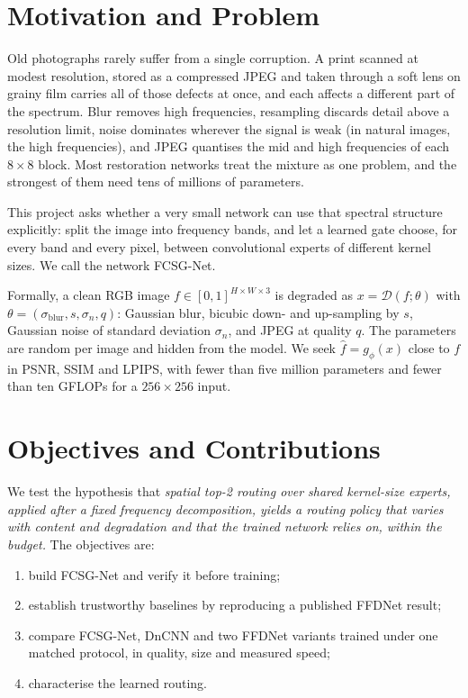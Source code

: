 \documentclass[12pt,a4paper,oneside]{NITR}
\newcommand{\fcsg}{FCSG-Net}
\begin{document}
\section{Motivation and Problem}\label{sec:motivation}

Old photographs rarely suffer from a single corruption. A print scanned at
modest resolution, stored as a compressed JPEG and taken through a soft lens
on grainy film carries all of those defects at once, and each affects a
different part of the spectrum. Blur removes high frequencies, resampling
discards detail above a resolution limit, noise dominates wherever the signal
is weak (in natural images, the high frequencies), and JPEG quantises the mid
and high frequencies of each $8\times8$ block. Most restoration networks
treat the mixture as one problem, and the strongest of them
need tens of millions of parameters.

This project asks whether a very small network can use that spectral
structure explicitly: split the image into frequency bands, and let a learned
gate choose, for every band and every pixel, between convolutional experts of
different kernel sizes. We call the network \fcsg{}.

Formally, a clean RGB image $f\in[0,1]^{H\times W\times 3}$ is degraded as
$x=\mathcal{D}(f;\theta)$ with $\theta=(\sigma_\text{blur}, s, \sigma_n, q)$:
Gaussian blur, bicubic down- and up-sampling by $s$, Gaussian noise of
standard deviation $\sigma_n$, and JPEG at quality $q$. The parameters are
random per image and hidden from the model. We seek $\hat f=g_\phi(x)$ close
to $f$ in PSNR, SSIM and LPIPS, with fewer than five million parameters and
fewer than ten GFLOPs for a $256\times256$ input.

\section{Objectives and Contributions}\label{sec:objectives}

We test the hypothesis that \emph{spatial top-2 routing over shared
kernel-size experts, applied after a fixed frequency decomposition, yields a
routing policy that varies with content and degradation and that the trained
network relies on, within the budget.} The objectives are:
\begin{enumerate}
	\item[\textbf{O1}] build \fcsg{} and verify it before training;
	\item[\textbf{O2}] establish trustworthy baselines by reproducing a
	published FFDNet result;
	\item[\textbf{O3}] compare \fcsg{}, DnCNN and two FFDNet variants trained
	under one matched protocol, in quality, size and measured speed;
	\item[\textbf{O4}] characterise the learned routing.
\end{enumerate}
\end{document}
